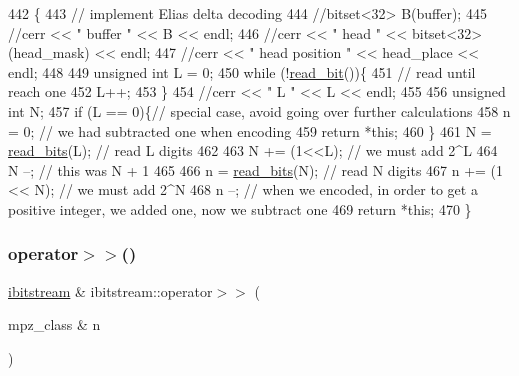 \begin{DoxyCode}
442                                                    \{
443   \textcolor{comment}{// implement Elias delta decoding}
444   \textcolor{comment}{//bitset<32> B(buffer);}
445   \textcolor{comment}{//cerr << " buffer " << B << endl;}
446   \textcolor{comment}{//cerr << " head " << bitset<32>(head\_mask) << endl;}
447   \textcolor{comment}{//cerr << " head position " << head\_place << endl;}
448   
449   \textcolor{keywordtype}{unsigned} \textcolor{keywordtype}{int} L = 0;
450   \textcolor{keywordflow}{while} (!\hyperlink{classibitstream_a895239acf7179f6778388c39c97643e4}{read\_bit}())\{
451     \textcolor{comment}{// read until reach one}
452     L++;
453   \}
454   \textcolor{comment}{//cerr << " L " << L << endl;}
455   
456   \textcolor{keywordtype}{unsigned} \textcolor{keywordtype}{int} N;
457   \textcolor{keywordflow}{if} (L == 0)\{\textcolor{comment}{// special case, avoid going over further calculations}
458     n = 0; \textcolor{comment}{// we had subtracted one when encoding }
459     \textcolor{keywordflow}{return} *\textcolor{keyword}{this};
460   \}
461   N = \hyperlink{classibitstream_a2fdcaecf10fefa6942dcd5286a2696e0}{read\_bits}(L); \textcolor{comment}{// read L digits}
462   
463   N += (1<<L); \textcolor{comment}{// we must add 2^L}
464   N --; \textcolor{comment}{// this was N + 1}
465   
466   n = \hyperlink{classibitstream_a2fdcaecf10fefa6942dcd5286a2696e0}{read\_bits}(N); \textcolor{comment}{// read N digits}
467   n += (1 << N); \textcolor{comment}{// we must add 2^N}
468   n --; \textcolor{comment}{// when we encoded, in order to get a positive integer, we added one, now we subtract one}
469   \textcolor{keywordflow}{return} *\textcolor{keyword}{this};
470 \}
\end{DoxyCode}
\mbox{\label{classibitstream_a0264d01fa1211c4bb73f5de2bc68adbc}} 
\subsubsection{\texorpdfstring{operator$>$$>$()}{operator>>()}\hspace{0.1cm}{\footnotesize\ttfamily [2/2]}}
{\footnotesize\ttfamily \hyperlink{classibitstream}{ibitstream} \& ibitstream\+::operator$>$$>$ (\begin{DoxyParamCaption}\item[{mpz\+\_\+class \&}]{n }\end{DoxyParamCaption})}



